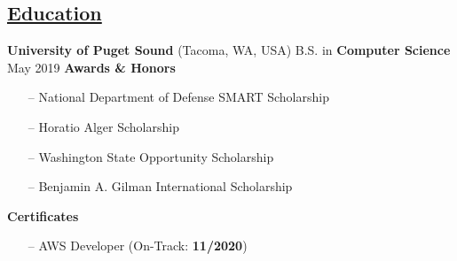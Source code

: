 \documentclass{article}
\begin{document}
\begin{multicols}{2}
\section*{\underline{Education}}
{\footnotesize{
\textbf{University of Puget Sound} (Tacoma, WA, USA)
\newline B.S. in \textbf{Computer Science}
\newline May 2019
\newline\newline\textbf{Awards \& Honors}
\begin{itemize}
	\item[--] National Department of Defense SMART Scholarship
	\item[--] Horatio Alger Scholarship
	\item[--] Washington State Opportunity Scholarship
	\item[--] Benjamin A. Gilman International Scholarship   
\end{itemize} 
\newline\newline\textbf{Certificates}
\begin{itemize}
	\item[--] AWS Developer (On-Track: \textbf{11/2020})
\end{itemize} 
}}

\hfill  \quad

\end{multicols} 
\end{document}
